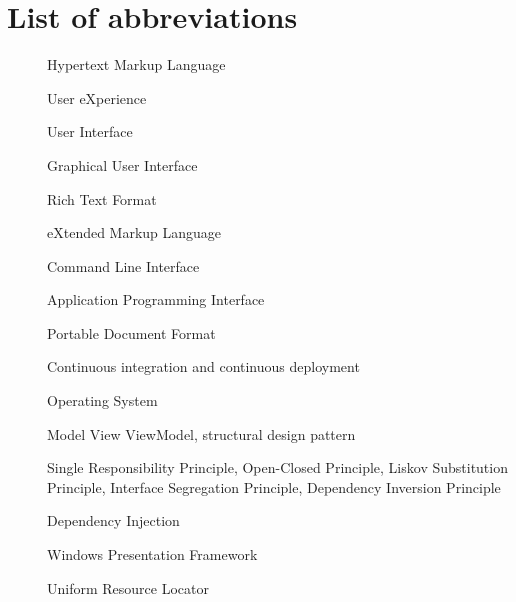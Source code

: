 \chapter*{List of abbreviations}

\begin{multicols}{2}
    \raggedright
    \begin{description}
        \item [] Hypertext Markup Language
        \item [] User eXperience
        \item [] User Interface
        \item [] Graphical User Interface
        \item [] Rich Text Format
        \item [] eXtended Markup Language
        \item [] Command Line Interface
        \item [] Application Programming Interface
        \item [] Portable Document Format
        \item [] Continuous integration and continuous deployment
        \item [] Operating System
        \item [] Model View ViewModel, structural design pattern
        \item [] Single Responsibility Principle, Open-Closed Principle, Liskov Substitution Principle, Interface Segregation Principle, Dependency Inversion Principle
        \item [] Dependency Injection
        \item [] Windows Presentation Framework
        \item [] Uniform Resource Locator
    \end{description}
\end{multicols}

